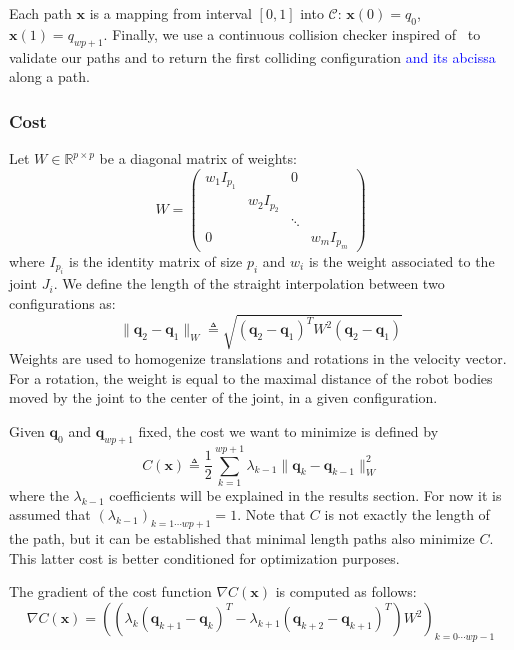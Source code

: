 \documentclass{tADR2e}
\newcommand\real{\mathbb{R}}
\newcommand\CS{\mathcal{C}}
\newcommand\conf{\mathbf{q}}
\newcommand\xx{\mathbf{x}} %
\newcommand\cost{C}
\newcommand\weight{W}
\begin{document}
Each path $\xx$ is a mapping from 
interval $[0,1]$ into $\CS$: $\xx(0) = q_0$, $\xx(1) = q_{wp+1}$.
Finally, we use a continuous 
collision checker inspired of~\cite{SchwarzerExactCollision} to validate our 
paths and to return the first colliding configuration 
\textcolor{blue}{and its abcissa} along a path.

\subsubsection{Cost}
Let $W\in\real^{p\times p}$ be a diagonal matrix of weights:
$$
W=\left(\begin{array}{cccccccccc}
w_1 I_{p_1}       &        &  0  \\
    & w_2 I_{p_2} &        &   \\
    &            & \ddots &   \\
  0 &            &        & w_m I_{p_m}
\end{array}\right)
$$
where $I_{p_i}$ is the identity matrix of size $p_i$ and $w_i$ is the weight 
associated to the joint $J_i$. We define the length of the straight interpolation 
between two configurations as:
$$
\|\conf_2 - \conf_1\|_{W} \triangleq \sqrt{(\conf_2 - \conf_1)^T W^2 (\conf_2 - 
\conf_1)}
$$
Weights are used to homogenize translations and rotations in the velocity vector. 
For a rotation, the weight is equal to the maximal distance of the robot bodies 
moved by the joint to the center of the joint, in a given configuration.

Given $\conf_0$ and $\conf_{wp+1}$ fixed, the cost we want to minimize is defined 
by
$$
\cost (\xx) \triangleq \frac{1}{2}\sum_{k=1}^{wp+1} \lambda_{k-1} \|\conf_{k}-\conf_{k-1}\|_{W}
^{2}
$$
where the $\lambda_{k-1}$ coefficients will be explained in the results 
section. For now it is assumed that $(\lambda_{k-1})_{k=1\cdots wp+1}=1$. Note that 
$\cost$ is not exactly the length of the path, but it can be 
established that minimal length paths also minimize $\cost$. This latter cost is 
better conditioned for optimization purposes.

The gradient of the cost function $\nabla \cost (\xx)$ is computed as follows:
$$
\nabla \cost (\xx) = 
\left( (\lambda_{k}(\conf_{k+1} - \conf_{k})^T - \lambda_{k+1}(\conf_{k+2} - \conf_{k+1})^T) \weight^2 \right)_{k=0\cdots wp-1}
$$
\end{document}
